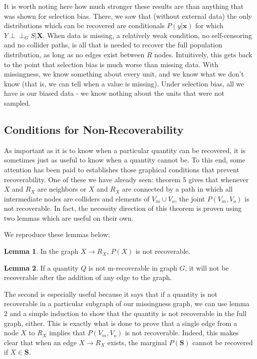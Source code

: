 \documentclass[12pt,twoside]{reedthesis}
\theoremstyle{definition}
\newtheorem{lemma}{Lemma}[section]
\newcommand{\dsep}{\perp \!\!\!\perp}
\begin{document}
It is worth noting here how much stronger these results are than anything that was shown for selection bias. There, we saw that (without external data) the only distributions which can be recovered are conditionals $P(y | \mathbf{x})$ for which $Y \dsep_G S | \mathbf{X}$. When data is missing, a relatively weak condition, no self-censoring and no collider paths, is all that is needed to recover the full population distribution, as long as no edges exist between $R$ nodes. Intuitively, this gets back to the point that selection bias is much worse than missing data. With missingness, we know something about every unit, and we know what we don't know (that is, we can tell when a value is missing). Under selection bias, all we have is our biased data -  we know nothing about the units that were not sampled.

\subsection{Conditions for Non-Recoverability}

As important as it is to know when a particular quantity can be recovered, it is sometimes just as useful to know when a quantity cannot be. To this end, some attention has been paid to establishes those graphical conditions that prevent recoverability.  One of these we have already seen: theorem 5 gives that whenever $X$ and $R_X$ are neighbors or $X$ and $R_X$ are connected by a path in which all intermediate nodes are colliders and elements of $V_m \cup V_o$, the joint $P(V_m, V_o)$ is not recoverable. In fact, the necessity direction of this theorem is proven using two lemmas which are useful on their own. 

We reproduce these lemmas below:

\begin{lemma}
In the graph $X \rightarrow R_X$, $P(X)$ is not recoverable.
\end{lemma}

\begin{lemma}
If a quantity $Q$ is not m-recoverable in graph $G$, it will not be recoverable after the addition of any edge to the graph.
\end{lemma}

The second is especially useful because it says that if a quantity is not recoverable in a particular subgraph of our missingness graph, we can use lemma 2 and a simple induction to show that the quantity is not recoverable in the full graph, either. This is exactly what is done to prove that a single edge from a node $X$ to $R_X$ implies that $P(V_m, V_o)$ is not recoverable. Indeed, this makes clear that when an edge $X \rightarrow R_X$ exists, the marginal $P(\mathbf{S})$ cannot be recovered if $X \in \mathbf{S}$. 
\end{document}

